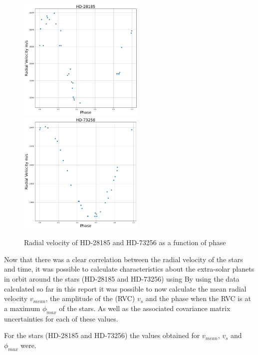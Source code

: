 \documentclass[]{article}
\begin{document}
\begin{figure}[h]
\includegraphics[width=6cm]{images/HD-28185_phase.png}
\includegraphics[width=6cm]{images/HD-73256_phase.png}
\caption{Radial velocity of HD-28185 and HD-73256 as a function of phase}
\label{fig:HD-_phase}
\end{figure}

Now that there was a clear correlation between the radial velocity of the stars and
time, it was possible to calculate characteristics about the extra-solar planets in 
orbit around the stars (HD-28185 and HD-73256) using %
By using the data calculated so far in this report it was possible to now calculate 
the mean radial velocity $v_{mean} $, the amplitude of the (RVC)
 $v_{s}$ and the 
phase when the RVC is at a maximum $\phi_{max}$ of the stars.
As well as the associated covariance matrix uncertainties for each of these values.
\par
For the stars (HD-28185 and HD-73256) the values obtained for $v_{mean}$, $v_{s}$ 
and $\phi_{max}$ were.
\end{document}
